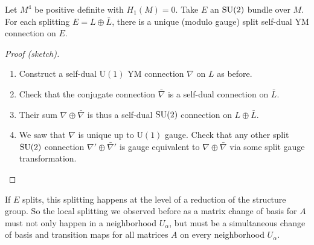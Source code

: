 \documentclass[main]{subfiles}
\begin{document}
\begin{lemma}
Let $M^4$ be positive definite with $H_1(M)=0$. Take $E$ an $\operatorname{SU}(2)$ bundle over $M$. For each splitting $E = L\oplus\bar L$, there is a unique (modulo gauge) split self-dual YM connection on $E$.
\end{lemma}

\begin{proof}[Proof (sketch)]
\begin{enumerate}
	\item Construct a self-dual $\mathrm{U}(1)$ YM connection $\nabla$ on $L$ as before.
	\item Check that the conjugate connection $\bar\nabla$ is a self-dual connection on $\bar L$.
	\item Their sum $\nabla \oplus \bar\nabla$ is thus a self-dual $\operatorname{SU}(2)$ connection on $L\oplus \bar L$.
	\item We saw that $\nabla$ is unique up to $\mathrm{U}(1)$ gauge. Check that any other split $\operatorname{SU}(2)$ connection $\nabla'\oplus\bar\nabla'$ is gauge equivalent to $\nabla\oplus\bar\nabla$ via some split gauge transformation.
\end{enumerate}
\end{proof}

\begin{remark}
If $E$ splits, this splitting happens at the level of a reduction of the structure group. So the local splitting we observed before as a matrix change of basis for $A$ must not only happen in a neighborhood $U_\alpha$, but must be a simultaneous change of basis and transition maps for all matrices $A$ on every neighborhood $U_\alpha$.
\end{remark}
\end{document}
